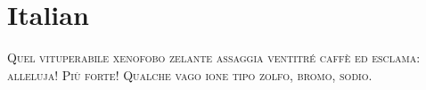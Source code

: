 

\presection\section*{\checkyes Italian}\postsection

\noindent\textsc{
Quel vituperabile xenofobo zelante assaggia ventitré caffè ed esclama: alleluja! Più forte!
Qualche vago ione tipo zolfo, bromo, sodio.}